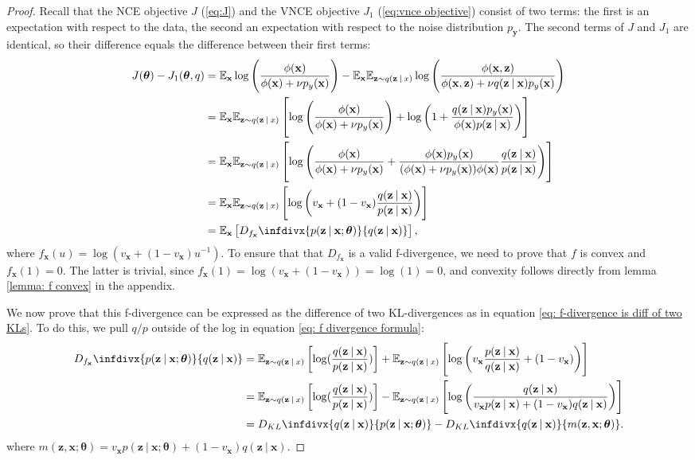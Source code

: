 \documentclass[11pt, oneside]{article}
\newcommand{\thetab}{{\boldsymbol{\theta}}}
\newcommand{\pnn}{\phi}
\newcommand{\pnoise}{p_{ \mathbf y}}
\newcommand{\q}[1]{q(\z \given{#1})}
\newcommand{\x}{{\mathbf x}}
\newcommand{\z}{{\mathbf z}}
\newcommand{\E}{\mathbb{E}}
\newcommand{\Ex}{\E_{\x}}
\newcommand{\Evar}[1]{\E_{\z \sim \q{#1}}}
\newcommand\given[1][]{\:#1\vert\:}
\newcommand{\infdiv}[1]{D_{#1}\infdivx}
\theoremstyle{definition}
\begin{document}
\begin{proof}
Recall that the NCE objective $J$ (\ref{eq:J}) and the VNCE objective $J_1$ (\ref{eq:vnce objective}) consist of two terms: the first is an expectation with respect to the data, the second an expectation with respect to the noise distribution $\pnoise$. The second terms of $J$ and $J_1$ are identical, so their difference equals the difference between their first terms:
\begin{align}
    J(\thetab) - J_1(\thetab, q) 
    &= \Ex \log \left( \frac{\pnn(\x)}{\pnn(\x) + \nu p_{y}(\x)} \right) 
    - \Ex \Evar{x} \log \left( \frac{\pnn(\x, \z)}{\pnn(\x, \z) + \nu q(\z \given \x) p_{y}(\x)} \right) \\
    &= \Ex \Evar{x} \left[ \log \left( \frac{\pnn(\x)}{\pnn(\x) + \nu p_{y}(\x)} \right) + \log \left( 1 + \frac{q(\z \given \x) p_{y}(\x)}{\phi(\x) p(\z \given \x)} \right) \right] \\
    &= \Ex \Evar{x} \left[ \log \left( \frac{\pnn(\x)}{\pnn(\x) + \nu p_{y}(\x)} + \frac{ \pnn(\x) p_{y}(\x)}{(\pnn(\x) + \nu p_{y}(\x))\phi(\x)} \frac{q(\z \given \x)}{p(\z \given \x)} \right) \right] \\
    \label{eq: f divergence formula}
    &= \Ex \Evar{x} \left[ \log \left( v_{\x} + (1 - v_{\x}) \frac{q(\z \given \x)}{p(\z \given \x)} \right) \right] \\
    &=  \Ex \left[ \infdiv{f_{\x}}{p(\z \given \x; \thetab)}{q(\z \given \x)} \right],
\end{align}
where $f_{\x}(u) = \log(v_{\x} + (1 - v_{\x})u^{-1})$. To ensure that that $D_{f_{\x}}$ is a valid f-divergence, we need to prove that $f$ is convex and $f_{\x}(1) = 0$. The latter is trivial, since $f_{\x}(1) = \log(v_{\x} + (1 - v_{\x})) = \log(1) = 0$, and convexity follows directly from lemma \ref{lemma: f convex} in the appendix.

We now prove that this f-divergence can be expressed as the difference of two KL-divergences as in equation \ref{eq: f-divergence is diff of two KLs}. To do this, we pull $q/p$ outside of the log in equation \ref{eq: f divergence formula}:
\begin{align}
    \infdiv{f_{\x}}{p(\z \given \x; \thetab)}{q(\z \given \x)} 
    &= \Evar{x} \left[ \log( \frac{q(\z \given \x)}{p(\z \given \x)}) \right] 
    + \Evar{x} \left[ \log \left( v_{\x}\frac{p(\z \given \x)}{q(\z \given \x)} + (1 - v_{\x}) \right) \right] \\
    &= \Evar{x} \left[ \log( \frac{q(\z \given \x)}{p(\z \given \x)}) \right] 
    - \Evar{x} \left[ \log \left( \frac{q(\z \given \x)}{v_{\x}p(\z \given \x) + (1 - v_{\x})q(\z \given \x)} \right) \right] \\
    &= \infdiv{KL}{q(\z \given \x)}{p(\z \given \x; \thetab)} - \infdiv{KL}{q(\z \given \x)}{m(\z, \x ; \thetab)}.
\end{align}
where $m(\z, \x ; \thetab) = v_{\x}p(\z \given \x; \thetab) + (1 - v_{\x})q(\z \given \x)$.
\end{proof}
\end{document}

